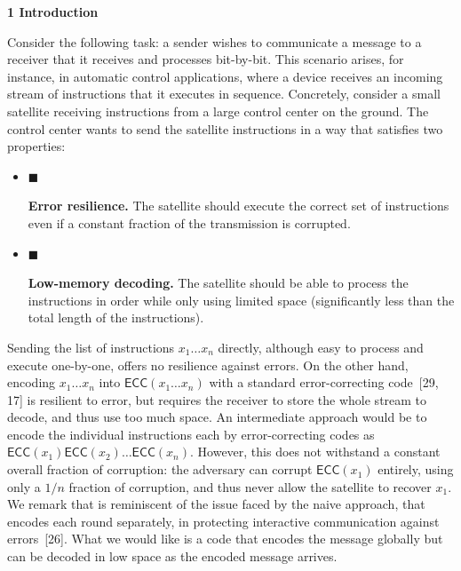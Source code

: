 

\par\medskip\noindent\textbf{
1 Introduction}\par




Consider the following task: a sender wishes to communicate a message to a receiver that it receives and processes bit-by-bit. This scenario arises, for instance, in automatic control applications, where a device receives an incoming stream of instructions that it executes in sequence. Concretely, consider a small satellite receiving instructions from a large control center on the ground. The control center wants to send the satellite instructions in a way that satisfies two properties:\par


\begin{itemize}


\item[] 
$\blacksquare$ 


\textbf{Error resilience.} The satellite should execute the correct set of instructions even if a constant fraction of the transmission is corrupted.\par





\item[] 
$\blacksquare$ 


\textbf{Low-memory decoding.} The satellite should be able to process the instructions in order while only using limited space (significantly less than the total length of the instructions).\par





\end{itemize}




Sending the list of instructions $x_{1}\ldots x_{n}$ directly, although easy to process and execute one-by-one, offers no resilience against errors. On the other hand, encoding $x_{1}\ldots x_{n}$ into $\mathsf{ECC}(x_{1}\ldots x_{n})$ with a standard error-correcting code [29, 17] is resilient to error, but requires the receiver to store the whole stream to decode, and thus use too much space. An intermediate approach would be to encode the individual instructions each by error-correcting codes as $\mathsf{ECC}(x_{1})\mathsf{ECC}(x_{2})\ldots\mathsf{ECC}(x_{n})$. However, this does not withstand a constant overall fraction of corruption: the adversary can corrupt $\mathsf{ECC}(x_{1})$ entirely, using only a $1/n$ fraction of corruption, and thus never allow the satellite to recover $x_{1}$. We remark that is reminiscent of the issue faced by the naive approach, that encodes each round separately, in protecting interactive communication against errors [26].
What we would like is a code that encodes the message globally but can be decoded in low space as the encoded message arrives.\par




